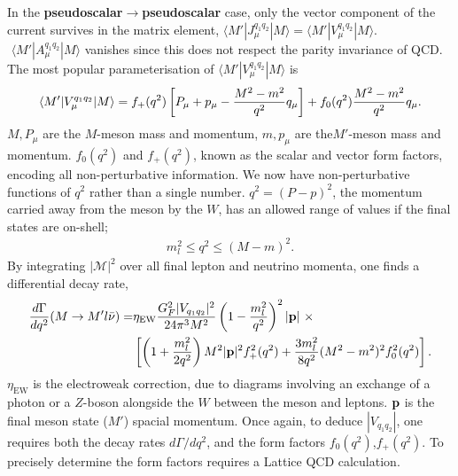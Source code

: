 In the {\bf{pseudoscalar$\to$pseudoscalar}} case, only the vector component of the current survives in the matrix element, $\langle M' | J_{\mu}^{q_1q_2} | M \rangle = \langle M' | V_{\mu}^{q_1q_2} | M \rangle$. $\,\,\langle M' | A_{\mu}^{q_1q_2} | M \rangle$ vanishes since this does not respect the parity invariance of QCD. The most popular parameterisation of $\langle M' | V_{\mu}^{q_1q_2} | M \rangle$ is
\begin{align}
  \langle M' | V_{\mu}^{q_1q_2} | M \rangle = f_+(q^2) \left[ P_{\mu} + p_{\mu} - {M^2-m^2\over q^2} q_{\mu} \right]  + f_0(q^2) {M^2-m^2\over q^2} q_{\mu}.
  \label{eq:formfactors_experimental}
\end{align}
$M,P_{\mu}$ are the $M$-meson mass and momentum, $m,p_{\mu}$ are the$M'$-meson mass and momentum. $f_0(q^2)$ and $f_+(q^2)$, known as the scalar and vector form factors, encoding all non-perturbative information. We now have non-perturbative functions of $q^2$ rather than a single number. $q^2=(P-p)^2$, the momentum carried away from the meson by the $W$, has an allowed range of values if the final states are on-shell;
\begin{align}
  m_l^2 \leq q^2 \leq (M-m)^2.
\end{align}
By integrating $|\mathcal{M}|^2$ over all final lepton and neutrino momenta, one finds a differential decay rate,
\begin{align}
  {d\Gamma\over dq^2}(M\to M'l\bar{\nu}) =& \eta_{\text{EW}} { G_F^2 |V_{q_1q_2}|^2\over 24 \pi^3 M^2 } \left( 1 - {m_l^2\over q^2}\right)^2 |{\bf{p}}| \,\,\times \\
  \label{eq:branchingfraction}
  &\left[ \left( 1 + {m_l^2\over 2q^2}\right) M^2 |{\bf{p}}|^2 f_+^2(q^2) + {3m_l^2\over 8q^2} (M^2-m^2)^2 f_0^2(q^2) \right]. \nonumber
\end{align}
$\eta_{\text{EW}}$ is the electroweak correction, due to diagrams involving an exchange of a photon or a $Z$-boson alongside the $W$ between the meson and leptons. ${\bf{p}}$ is the final meson state ($M'$) spacial momentum. Once again, to deduce $|V_{q_1q_2}|$, one requires both the decay rates $d\Gamma/dq^2$, and the form factors $f_0(q^2)$,$f_+(q^2)$. To precisely determine the form factors requires a Lattice QCD calculation.

